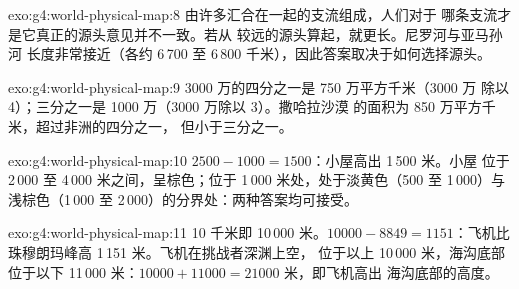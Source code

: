 \begin{solution}{exo:g4:world-physical-map:8}
由许多汇合在一起的支流组成，人们对于
哪条支流才是它真正的源头意见并不一致。若从
较远的源头算起，就更长。尼罗河与亚马孙河
长度非常接近（各约 6\,700 至 6\,800 千米），因此答案取决于如何选择源头。
\end{solution}

\begin{solution}{exo:g4:world-physical-map:9}
3000 万的四分之一是 750 万平方千米（3000 万
除以 4）；三分之一是 1000 万（3000 万除以 3）。撒哈拉沙漠
的面积为 850 万平方千米，超过非洲的四分之一，
但小于三分之一。
\end{solution}

\begin{solution}{exo:g4:world-physical-map:10}
$2500 - 1000 = 1500$：小屋高出 1\,500 米。小屋
位于 2\,000 至 4\,000 米之间，呈棕色；位于
1\,000 米处，处于淡黄色（500 至 1\,000）与
浅棕色（1\,000 至 2\,000）的分界处：两种答案均可接受。
\end{solution}

\begin{solution}{exo:g4:world-physical-map:11}
10 千米即 10\,000 米。$10000 - 8849 = 1151$：飞机比
珠穆朗玛峰高 1\,151 米。飞机在挑战者深渊上空，
位于以上 10\,000 米，海沟底部位于以下
11\,000 米：$10000 + 11000 = 21000$ 米，即飞机高出
海沟底部的高度。
\end{solution}
